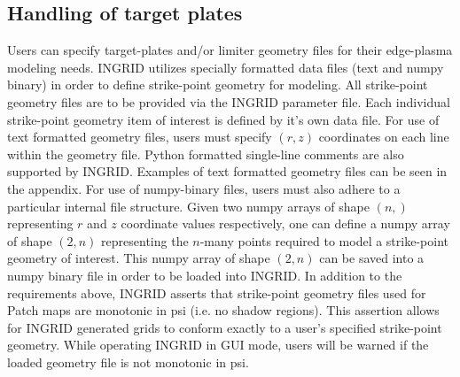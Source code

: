 \subsection{Handling of target plates}
Users can specify target-plates and/or limiter geometry files for their edge-plasma modeling needs. INGRID utilizes specially formatted data files (text and numpy binary) in order to define strike-point geometry for modeling. All strike-point geometry files are to be provided via the INGRID parameter file. Each individual strike-point geometry item of interest is defined by it's own data file.
For use of text formatted geometry files, users must specify $(r,z)$ coordinates on each line within the geometry file. Python formatted single-line comments are also supported by INGRID. Examples of text formatted geometry files can be seen in the appendix. 
For use of numpy-binary files, users must also adhere to a particular internal file structure. Given two numpy arrays of shape $(n, )$ representing $r$ and $z$ coordinate values respectively, one can define a numpy array of shape $(2,n)$ representing the $n$-many points required to model a strike-point geometry of interest. This numpy array of shape $(2, n)$ can be saved into a numpy binary file in order to be loaded into INGRID.
In addition to the requirements above, INGRID asserts that strike-point geometry files used for Patch maps are monotonic in psi (i.e. no shadow regions). This assertion allows for INGRID generated grids to conform exactly to a user's specified strike-point geometry. While operating INGRID in GUI mode, users will be warned if the loaded geometry file is not monotonic in psi. 